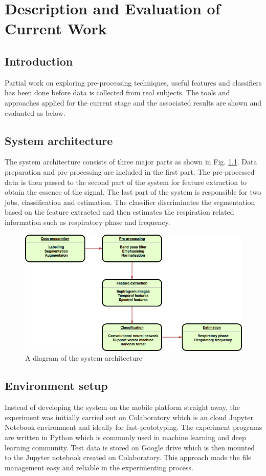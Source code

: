 \chapter{Description and Evaluation of Current Work}
\section{Introduction}
Partial work on exploring pre-processing techniques, useful features and classifiers has been done before data is collected from real subjects. The tools and approaches applied for the current stage and the associated results are shown and evaluated as below.

\section{System architecture}
The system architecture consists of three major parts as shown in Fig. \ref{fig:system_architecture}. Data preparation and pre-processing are included in the first part. The pre-processed data is then passed to the second part of the system for feature extraction to obtain the essence of the signal. The last part of the system is responsible for two jobs, classification and estimation. The classifier discriminates the segmentation based on the feature extracted and then estimates the respiration related information such as respiratory phase and frequency. 

\begin{figure}[h]
    \centerline{\includegraphics[scale=0.55]{figures/system_architecture.png}}
    \caption{A diagram of the system architecture}
    \label{fig:system_architecture}
\end{figure}


\section{Environment setup}
Instead of developing the system on the mobile platform straight away, the experiment was initially carried out on Colaboratory which is an cloud Jupyter Notebook environment and ideally for fast-prototyping. The experiment programs are written in Python which is commonly used in machine learning and deep learning community. Test data is stored on Google drive which is then mounted to the Jupyter notebook created on Colaboratory. This approach made the file management easy and reliable in the experimenting process. 

